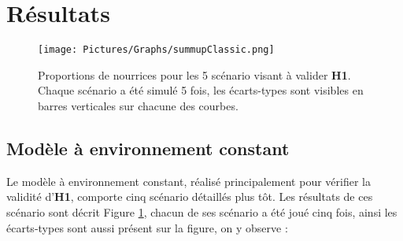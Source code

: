 			
			
	\section{Résultats}
	
	\begin{figure}
	\centering
	\texttt{[image: Pictures/Graphs/summupClassic.png]}
	\caption{Proportions de nourrices pour les 5 scénario visant à valider \textbf{H1}. Chaque scénario a été simulé 5 fois, les écarts-types sont visibles en barres verticales sur chacune des courbes.}
	\label{envConstant}
	\end{figure}
	
	\subsection{Modèle à environnement constant}
	
	Le modèle à environnement constant, réalisé principalement pour vérifier la validité d'\textbf{H1}, comporte cinq scénario détaillés plus tôt. Les résultats de ces scénario sont décrit Figure \ref{envConstant}, chacun de ses scénario a été joué cinq fois, ainsi les écarts-types sont aussi présent sur la figure, on y observe :
	
